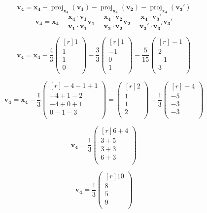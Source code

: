 \documentclass{article}
\begin{document}
\[
\mathbf{v_4} = \mathbf{x_4} - \operatorname{proj}_{\mathbf{x_4}}(\mathbf{v_1}) - \operatorname{proj}_{\mathbf{x_4}}(\mathbf{v_2}) - \operatorname{proj}_{\mathbf{x_4}}(\mathbf{v_3}')  
\]
\[
\mathbf{v_4} = \mathbf{x_4} - \frac{\mathbf{x_4} \cdot \mathbf{v_1}}{\mathbf{v_1} \cdot \mathbf{v_1}} \mathbf{v_1} - \frac{\mathbf{x_4} \cdot \mathbf{v_2}}{\mathbf{v_2} \cdot \mathbf{v_2}} \mathbf{v_2} - \frac{\mathbf{x_4} \cdot \mathbf{v_3}'}{\mathbf{v_3}' \cdot \mathbf{v_3}'} \mathbf{v_3}' 
\]

\[
\mathbf{v_4} = \mathbf{x_4} - \frac{4}{3}\begin{pmatrix*}[r]
 1 \\
 1 \\
 1 \\
 0 \\
\end{pmatrix*} - 
\frac{3}{3}\begin{pmatrix*}[r]
 1 \\
 -1 \\
 0 \\
 1 \\
\end{pmatrix*} -
\frac{5}{15}\begin{pmatrix*}[r]
 -1 \\
 2 \\
 -1 \\
 3 \\
\end{pmatrix*}
\]

\[
\mathbf{v_4} = \mathbf{x_4} - \frac{1}{3}\begin{pmatrix*}[r]
 -4 - 1 + 1 \\
 -4 + 1 - 2 \\
 -4 + 0 + 1 \\
 0 - 1 - 3 \\
\end{pmatrix*} = 
\begin{pmatrix*}[r]
 2 \\
 1 \\
 1 \\
 2 \\
\end{pmatrix*}
 - \frac{1}{3}
 \begin{pmatrix*}[r]
  -4 \\
  -5 \\
  -3 \\
  -3 \\
 \end{pmatrix*}
\]

\[
\mathbf{v_4} = 
\frac{1}{3}
\begin{pmatrix*}[r]
 6 + 4 \\
 3 + 5  \\
 3 + 3 \\
 6 + 3 \\
\end{pmatrix*}
\]

\[
\mathbf{v_4} = \frac{1}{3}
\begin{pmatrix*}[r]
 10 \\
 8 \\
 5 \\
 9 \\
\end{pmatrix*}
\]
\end{document}
